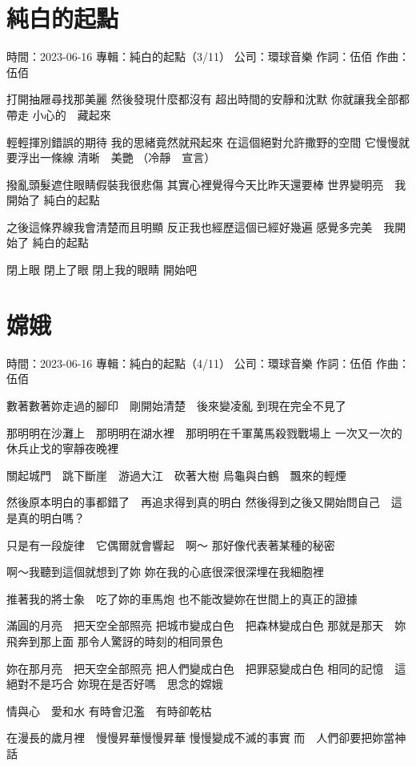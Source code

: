 \documentclass[UTF8,a4paper,oneside,twocolumn,12pt]{ctexbook}
\newcommand{\infopair}[2]{\textbullet #1：#2}
\newcommand{\zc}[1][伍佰]{\infopair{作詞}{#1}}
\newcommand{\zq}[1][伍佰]{\infopair{作曲}{#1}}
\newcommand{\zj}[1]{\infopair{專輯}{#1}}
\newcommand{\sj}[1]{\infopair{時間}{#1}}
\newcommand{\gs}[1]{\infopair{公司}{#1}}
\newenvironment{info}{\begin{flushleft}\kaishu
	}
	{\end{flushleft}\normalsize\yahei\par}
\newenvironment{lyric}{
	}
{}
\begin{document}
\section{純白的起點}
\begin{info}
	\sj{2023-06-16}
	\zj{純白的起點（3/11）}
	\gs{環球音樂}
	\zc
	\zq
\end{info}
\begin{lyric}%
	打開抽屜尋找那美麗
	然後發現什麼都沒有
	超出時間的安靜和沈默
	你就讓我全部都帶走
	小心的　藏起來

	輕輕揮別錯誤的期待
	我的思緒竟然就飛起來
	在這個絕對允許撒野的空間
	它慢慢就要浮出一條線
	清晰　美艷
	（冷靜　宣言）

	撥亂頭髮遮住眼睛假裝我很悲傷
	其實心裡覺得今天比昨天還要棒
	世界變明亮　我開始了
	純白的起點

	之後這條界線我會清楚而且明顯
	反正我也經歷這個已經好幾遍
	感覺多完美　我開始了
	純白的起點

	閉上眼
	閉上了眼
	閉上我的眼睛
	開始吧
\end{lyric}

\section{嫦娥}
\begin{info}
	\sj{2023-06-16}
	\zj{純白的起點（4/11）}
	\gs{環球音樂}
	\zc
	\zq
\end{info}
\begin{lyric}
	數著數著妳走過的腳印　剛開始清楚　後來變凌亂
	到現在完全不見了

	那明明在沙灘上　那明明在湖水裡　那明明在千軍萬馬殺戮戰場上
	一次又一次的休兵止戈的寧靜夜晚裡

	關起城門　跳下斷崖　游過大江　砍著大樹
	烏龜與白鶴　飄來的輕煙

	然後原本明白的事都錯了　再追求得到真的明白
	然後得到之後又開始問自己　這是真的明白嗎？

	只是有一段旋律　它偶爾就會響起　啊～
	那好像代表著某種的秘密

	啊～我聽到這個就想到了妳
	妳在我的心底很深很深埋在我細胞裡

	推著我的將士象　吃了妳的車馬炮
	也不能改變妳在世間上的真正的證據

	滿圓的月亮　把天空全部照亮
	把城市變成白色　把森林變成白色
	那就是那天　妳飛奔到那上面
	那令人驚訝的時刻的相同景色

	妳在那月亮　把天空全部照亮
	把人們變成白色　把罪惡變成白色
	相同的記憶　這絕對不是巧合
	妳現在是否好嗎　思念的嫦娥

	情與心　愛和水
	有時會氾濫　有時卻乾枯

	在漫長的歲月裡　慢慢昇華慢慢昇華
	慢慢變成不滅的事實
	而　人們卻要把妳當神話
\end{lyric}
\end{document}
